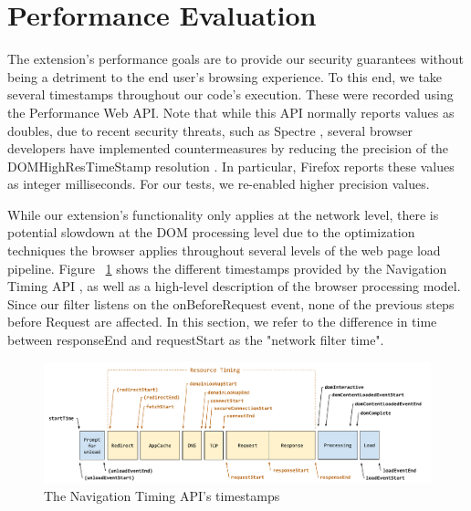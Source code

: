 \section{Performance Evaluation}
The extension's performance goals are to provide our security guarantees without being a detriment to the end user's browsing experience. To this end, we take several timestamps throughout our code's execution. These were recorded using the Performance Web API. Note that while this API normally reports values as doubles, due to recent security threats, such as Spectre \cite{DBLP:journals/corr/abs-1801-01203}, several browser developers have implemented countermeasures by reducing the precision of the DOMHighResTimeStamp resolution \cite{reducetimeprecision,resolutionconsiderations}. In particular, Firefox reports these values as integer milliseconds. For our tests, we re-enabled higher precision values.

While our extension's functionality only applies at the network level, there is potential slowdown at the DOM processing level due to the optimization techniques the browser applies throughout several levels of the web page load pipeline. Figure ~\ref{fig:navigationtiming} shows the different timestamps provided by the Navigation Timing API \cite{navigationtiming}, as well as a high-level description of the browser processing model. Since our filter listens on the onBeforeRequest event, none of the previous steps before Request are affected. In this section, we refer to the difference in time between responseEnd and requestStart as the "network filter time".

\begin{figure}[h]
 \includegraphics[scale=0.65]{img/timestamp-diagram.pdf}
 \caption{The Navigation Timing API's timestamps\protect\footnotemark}
 \label{fig:navigationtiming}
 \end{figure}


